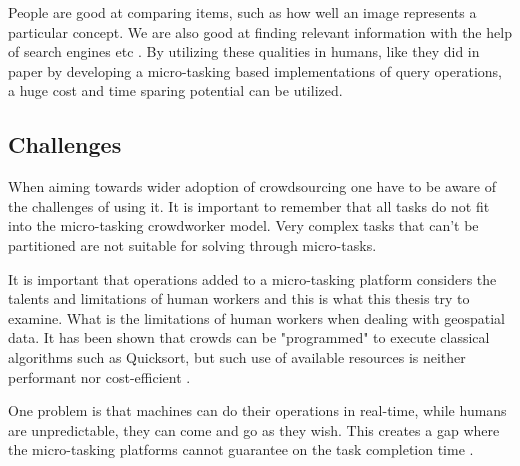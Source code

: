 People are good at comparing items, such as how well an image represents a particular concept. We are also good at finding relevant information with the help of search engines etc \citep{Franklin2011}. By utilizing these qualities in humans, like they did in \citep{Franklin2011} paper by developing a micro-tasking based implementations of query operations, a huge cost and time sparing potential can be utilized. 

\subsection{Challenges}
When aiming towards wider adoption of crowdsourcing one have to be aware of the challenges of using it. It is important to remember that all tasks do not fit into the micro-tasking crowdworker model. Very complex tasks that can't be partitioned are not suitable for solving through micro-tasks. 

It is important that operations added to a micro-tasking platform considers the talents and limitations of human workers \citep{Franklin2011} and this is what this thesis try to examine. What is the limitations of human workers when dealing with geospatial data. It has been shown that crowds can be "programmed" to execute classical algorithms such as Quicksort, but such use of available resources is neither performant nor cost-efficient \citep{Franklin2011}. 

One problem is that machines can do their operations in real-time, while humans are unpredictable, they can come and go as they wish. This creates a gap where the micro-tasking platforms cannot guarantee on the task completion time \citep{Difallah2016}. 
